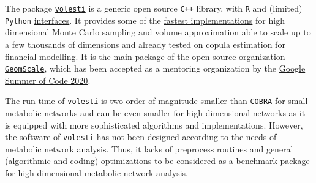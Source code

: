\documentclass[a4paper, 12pt]{article}
\begin{document}
The package \textcolor{blue}{\href{https://github.com/GeomScale/volume_approximation}{\texttt{volesti}}} is a generic open source \texttt{C++} library, with \texttt{R} and (limited) \texttt{Python} \textcolor{blue}{\href{https://CRAN.R-project.org/package=volesti}{interfaces}}. 
It provides some of the \textcolor{blue}{\href{https://github.com/GeomScale/volume_approximation/wiki}{fastest implementations}} for high dimensional Monte Carlo sampling and volume approximation able to scale up to a few thousands of dimensions and already tested on copula estimation for financial modelling. It is the main package of the open source organization \textcolor{blue}{\href{https://geomscale.github.io/}{{\tt GeomScale}}}, which has been accepted as a mentoring organization by the \textcolor{blue}{\href{https://summerofcode.withgoogle.com/organizations/5673184117915648/}{Google Summer of Code 2020}}.

The run-time of \texttt{volesti} is \textcolor{blue}{\href{https://github.com/GeomScale/volume_approximation/wiki/volesti-vs-cobra-toolbox}{two order of magnitude smaller than \texttt{COBRA}}} for small metabolic networks and can be even smaller for high dimensional networks as it is equipped with more sophisticated algorithms and implementations. However, the software of \texttt{volesti} has not been designed according to the needs of metabolic network analysis. Thus, it lacks of preprocess routines and general (algorithmic and coding) optimizations to be considered as a benchmark package for high dimensional metabolic network analysis.

\end{document}
